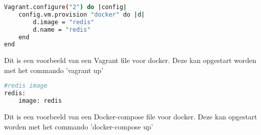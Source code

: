 \begin{lstlisting}[language=bash, style=configstyle]
Vagrant.configure("2") do |config|
	config.vm.provision "docker" do |d|
		d.image = "redis"
		d.name = "redis"
	end
end
\end{lstlisting}
Dit is een voorbeeld van een Vagrant file voor docker. Deze kan opgestart worden met het commando 'vagrant up'


\begin{lstlisting}[language=bash, style=configstyle]
#redis image
redis:
	image: redis
\end{lstlisting}
Dit is een voorbeeld van een Docker-compose file voor docker. Deze kan opgestart worden met het commando 'docker-compose up'

